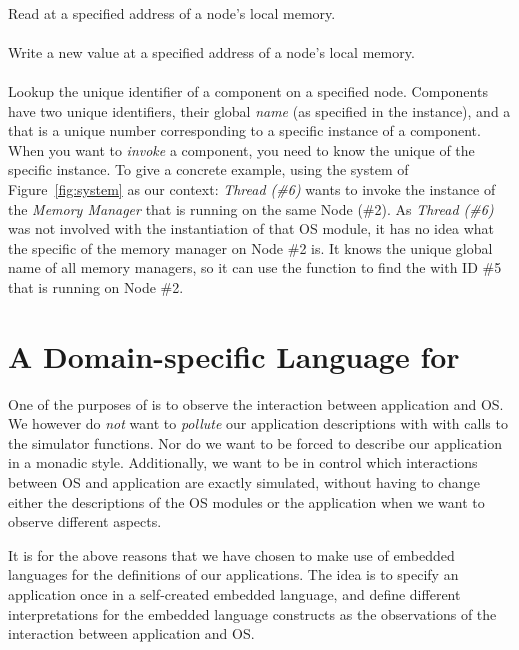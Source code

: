 \paragraph{}
Read at a specified address of a node's local memory.
\paragraph{}
Write a new value at a specified address of a node's local memory.
\paragraph{}
Lookup the unique identifier of a component on a specified node.
Components have two unique identifiers, their global \emph{name} (as specified in the  instance), and a  that is a unique number corresponding to a specific instance of a component.
When you want to \emph{invoke} a component, you need to know the unique  of the specific instance.
To give a concrete example, using the system of Figure~\ref{fig:system} as our context: \emph{Thread (\#6)} wants to invoke the instance of the \emph{Memory Manager} that is running on the same Node (\#2).
As \emph{Thread (\#6)} was not involved with the instantiation of that OS module, it has no idea what the specific  of the memory manager on Node \#2 is.
It knows the unique global name of all memory managers, so it can use the  function to find the  with ID \#5 that is running on Node \#2.

\section{A Domain-specific Language for \soosim}
\label{sec:dsl}
One of the purposes of \soosim is to observe the interaction between application and OS.
We however do \emph{not} want to \emph{pollute} our application descriptions with with calls to the simulator functions.
Nor do we want to be forced to describe our application in a monadic style.
Additionally, we want to be in control which interactions between OS and application are exactly simulated, without having to change either the descriptions of the OS modules or the application when we want to observe different aspects.

It is for the above reasons that we have chosen to make use of embedded languages for the definitions of our applications.
The idea is to specify an application once in a self-created embedded language, and define different interpretations for the embedded language constructs as the observations of the interaction between application and OS.

